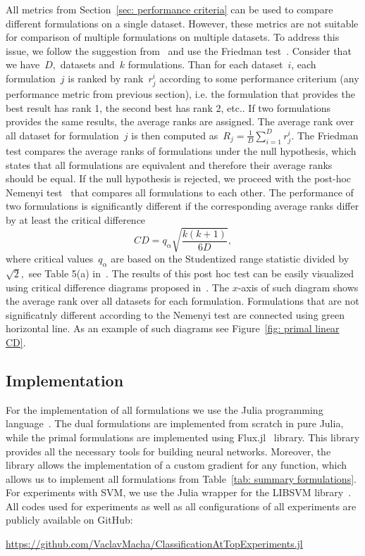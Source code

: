All metrics from Section~\ref{sec: performance criteria} can be used to compare different formulations on a single dataset. However, these metrics are not suitable for comparison of multiple formulations on multiple datasets. To address this issue, we follow the suggestion from~\cite{demvsar2006statistical} and use the Friedman test~\cite{friedman1940comparison}. Consider that we have~$D,$ datasets and~$k$ formulations. Than for each dataset~$i$, each formulation~$j$ is ranked by rank~$r^i_j$ according to some performance criterium (any performance metric from previous section), i.e. the formulation that provides the best result has rank 1, the second best has rank 2, etc.. If two formulations provides the same results, the average ranks are assigned. The average rank over all dataset for formulation~$j$ is then computed as~$R_j = \frac{1}{D} \sum_{i = 1}^{D} r^{i}_{j}.$ The Friedman test compares the average ranks of formulations under the null hypothesis, which states that all formulations are equivalent and therefore their average ranks should be equal. If the null hypothesis is rejected, we proceed with the post-hoc Nemenyi test~\cite{nemenyi1963distribution} that compares all formulations to each other. The performance of two formulations is significantly different if the corresponding average
ranks differ by at least the critical difference
\begin{equation*}
  CD = q_{\alpha} \sqrt{\frac{k(k + 1)}{6D}},
\end{equation*}
where critical values~$q_{\alpha}$ are based on the Studentized range statistic divided by~$\sqrt{2},$ see Table 5(a) in~\cite{demvsar2006statistical}. The results of this post hoc test can be easily visualized using critical difference diagrams proposed in~\cite{demvsar2006statistical}.  The $x$-axis of such diagram shows the average rank over all datasets for each formulation. Formulations that are not significatnly different according to the Nemenyi test are connected using green horizontal line. As an example of such diagrams see Figure~\ref{fig: primal linear CD}.

\subsection{Implementation}

For the implementation of all formulations we use the Julia programming language~\cite{bezanson2017julia}. The dual formulations are implemented from scratch in pure Julia, while the primal formulations are implemented using Flux.jl~\cite{innes:2018, Flux.jl-2018} library. This library provides all the necessary tools for building neural networks. Moreover, the library allows the implementation of a custom gradient for any function, which allows us to implement all formulations from Table~\ref{tab: summary formulations}. For experiments with SVM, we use the Julia wrapper for the LIBSVM library~\cite{chang2011libsvm}. All codes used for experiments as well as all configurations of all experiments are publicly available on GitHub:
\begin{center}
  \url{https://github.com/VaclavMacha/ClassificationAtTopExperiments.jl}
\end{center}

